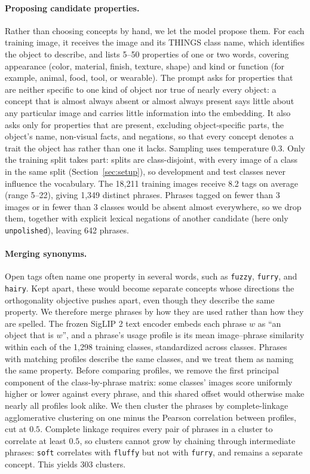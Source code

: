 \documentclass[mlmain,onecolumn]{jmlr}
\begin{document}
\paragraph{Proposing candidate properties.} Rather than choosing concepts by hand, we let the model propose them. For each training image, it receives the image and its THINGS class name, which identifies the object to describe, and lists 5--50 properties of one or two words, covering appearance (color, material, finish, texture, shape) and kind or function (for example, animal, food, tool, or wearable). The prompt asks for properties that are neither specific to one kind of object nor true of nearly every object: a concept that is almost always absent or almost always present says little about any particular image and carries little information into the embedding. It also asks only for properties that are present, excluding object-specific parts, the object's name, non-visual facts, and negations, so that every concept denotes a trait the object has rather than one it lacks. Sampling uses temperature 0.3. Only the training split takes part: splits are class-disjoint, with every image of a class in the same split (Section~\ref{sec:setup}), so development and test classes never influence the vocabulary. The 18,211 training images receive 8.2 tags on average (range 5--22), giving 1,349 distinct phrases. Phrases tagged on fewer than 3 images or in fewer than 3 classes would be absent almost everywhere, so we drop them, together with explicit lexical negations of another candidate (here only \texttt{unpolished}), leaving 642 phrases.

\paragraph{Merging synonyms.} Open tags often name one property in several words, such as \texttt{fuzzy}, \texttt{furry}, and \texttt{hairy}. Kept apart, these would become separate concepts whose directions the orthogonality objective pushes apart, even though they describe the same property. We therefore merge phrases by how they are used rather than how they are spelled. The frozen SigLIP 2 text encoder embeds each phrase $w$ as ``an object that is $w$'', and a phrase's usage profile is its mean image--phrase similarity within each of the 1,298 training classes, standardized across classes. Phrases with matching profiles describe the same classes, and we treat them as naming the same property. Before comparing profiles, we remove the first principal component of the class-by-phrase matrix: some classes' images score uniformly higher or lower against every phrase, and this shared offset would otherwise make nearly all profiles look alike. We then cluster the phrases by complete-linkage agglomerative clustering on one minus the Pearson correlation between profiles, cut at $0.5$. Complete linkage requires every pair of phrases in a cluster to correlate at least $0.5$, so clusters cannot grow by chaining through intermediate phrases: \texttt{soft} correlates with \texttt{fluffy} but not with \texttt{furry}, and remains a separate concept. This yields 303 clusters.
\end{document}
